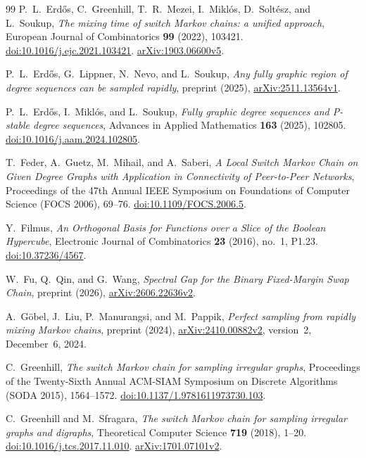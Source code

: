 \begin{thebibliography}{99}
P.~L.~Erd\H{o}s, C.~Greenhill, T.~R.~Mezei, I.~Mikl\'os,
D.~Solt\'esz, and L.~Soukup,
\emph{The mixing time of switch Markov chains: a unified approach},
European Journal of Combinatorics \textbf{99} (2022), 103421.
\href{https://doi.org/10.1016/j.ejc.2021.103421}{doi:10.1016/j.ejc.2021.103421}.
\href{https://arxiv.org/abs/1903.06600v5}{arXiv:1903.06600v5}.

P.~L.~Erd\H{o}s, G.~Lippner, N.~Nevo, and L.~Soukup,
\emph{Any fully graphic region of degree sequences can be sampled rapidly},
preprint (2025),
\href{https://arxiv.org/abs/2511.13564v1}{arXiv:2511.13564v1}.

P.~L.~Erd\H{o}s, I.~Mikl\'os, and L.~Soukup,
\emph{Fully graphic degree sequences and P-stable degree sequences},
Advances in Applied Mathematics \textbf{163} (2025), 102805.
\href{https://doi.org/10.1016/j.aam.2024.102805}{doi:10.1016/j.aam.2024.102805}.

T.~Feder, A.~Guetz, M.~Mihail, and A.~Saberi,
\emph{A Local Switch Markov Chain on Given Degree Graphs with Application
in Connectivity of Peer-to-Peer Networks},
Proceedings of the 47th Annual IEEE Symposium on Foundations of Computer
Science (FOCS 2006), 69--76.
\href{https://doi.org/10.1109/FOCS.2006.5}{doi:10.1109/FOCS.2006.5}.

Y.~Filmus,
\emph{An Orthogonal Basis for Functions over a Slice of the Boolean Hypercube},
Electronic Journal of Combinatorics \textbf{23} (2016), no.~1, P1.23.
\href{https://doi.org/10.37236/4567}{doi:10.37236/4567}.

W.~Fu, Q.~Qin, and G.~Wang,
\emph{Spectral Gap for the Binary Fixed-Margin Swap Chain},
preprint (2026), \href{https://arxiv.org/abs/2606.22636v2}{arXiv:2606.22636v2}.

A.~G\"obel, J.~Liu, P.~Manurangsi, and M.~Pappik,
\emph{Perfect sampling from rapidly mixing Markov chains},
preprint (2024),
\href{https://arxiv.org/abs/2410.00882v2}{arXiv:2410.00882v2},
version~2, December~6, 2024.

C.~Greenhill,
\emph{The switch Markov chain for sampling irregular graphs},
Proceedings of the Twenty-Sixth Annual ACM-SIAM Symposium on Discrete
Algorithms (SODA 2015), 1564--1572.
\href{https://doi.org/10.1137/1.9781611973730.103}{doi:10.1137/1.9781611973730.103}.

C.~Greenhill and M.~Sfragara,
\emph{The switch Markov chain for sampling irregular graphs and digraphs},
Theoretical Computer Science \textbf{719} (2018), 1--20.
\href{https://doi.org/10.1016/j.tcs.2017.11.010}{doi:10.1016/j.tcs.2017.11.010}.
\href{https://arxiv.org/abs/1701.07101v2}{arXiv:1701.07101v2}.


\end{thebibliography}
